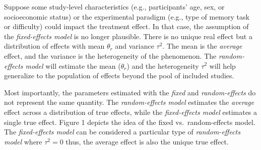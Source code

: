 \documentclass[
  man,floatsintext]{apa6}
\begin{document}
Suppose some study-level characteristics (e.g., participants' age, sex, or socioeconomic status) or the experimental paradigm (e.g., type of memory task or difficulty) could impact the treatment effect. In that case, the assumption of the \emph{fixed-effects model} is no longer plausible. There is no unique real effect but a distribution of effects with mean \(\theta_{r}\) and variance \(\tau^{2}\). The mean is the \emph{average} effect, and the variance is the heterogeneity of the phenomenon. The \emph{random-effects model} will estimate the mean (\(\theta_{r}\)) and the heterogeneity \(\tau^{2}\) will help generalize to the population of effects beyond the pool of included studies.

Most importantly, the parameters estimated with the \emph{fixed} and \emph{random-effects} do not represent the same quantity. The \emph{random-effects model} estimates the \emph{average} effect across a distribution of true effects, while the \emph{fixed-effects model} estimates a single true effect. Figure 1 depicts the idea of the fixed vs.~random-effects model. The \emph{fixed-effects model} can be considered a particular type of \emph{random-effects model} where \(\tau^{2} = 0\) thus, the average effect is also the unique true effect.

\scriptsize
\end{document}
